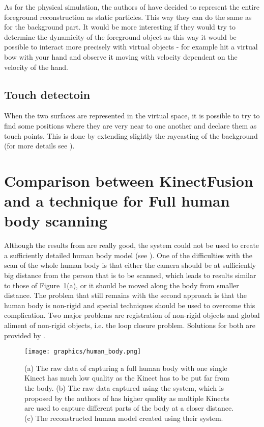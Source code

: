 \documentclass[11pt, a4paper]{article}
\theoremstyle{plain}
\begin{document}
    As for the physical simulation, the authors of \cite{kinectfusion} have
    decided to represent the entire foreground reconstruction as static
    particles. This way they can do the same as for the background part. It
    would be more interesting if they would try to determine the dynamicity of
    the foreground object as this way it would be possible to interact more
    precisely with virtual objects - for example hit a virtual bow with your
    hand and observe it moving with velocity dependent on the velocity of the
    hand.

  \subsection{Touch detectoin} %
  \label{sub:Touch detectoin}
    When the two surfaces are represented in the virtual space, it is possible
    to try to find some positions where they are very near to one another and
    declare them as touch points. This is done by extending slightly the
    raycasting of the background (for more details see \cite{kinectfusion}).

\section{Comparison between KinectFusion and a technique for Full human body
scanning} %
\label{sec:Comparison between KinectFusion and a technique for Full human body
scanning}
  Although the results from \cite{kinectfusion} are really good, the system
  could not be used to create a sufficiently detailed human body model (see
  \cite{body-scanning}). One of the difficulties with the scan of the whole
  human body is that either the camera should be at sufficiently big distance
  from the person that is to be scanned, which leads to results similar to those
  of Figure~\ref{fig:human-body}(a), or it should be moved along the body from
  smaller distance. The problem that still remains with the second approach is
  that the human body is non-rigid and special techniques should be used to
  overcome this complication. Two major problems are registration of non-rigid
  objects and global aliment of non-rigid objects, i.e. the loop closure
  problem. Solutions for both are provided by \cite{body-scanning}.

  \begin{figure}[h]
    \centering
    \texttt{[image: graphics/human\_body.png]}
    \caption{(a) The raw data of capturing a full human body with one single
      Kinect has much low quality as the Kinect has to be put far from the
      body. (b) The raw data captured using the system, which is proposed by the
      authors of \cite{body-scanning} has higher quality as multiple Kinects are
      used to capture different parts of the body at a closer distance. (c) The
      reconstructed human model created using their system.}
    \label{fig:human-body}
  \end{figure}
\end{document}
